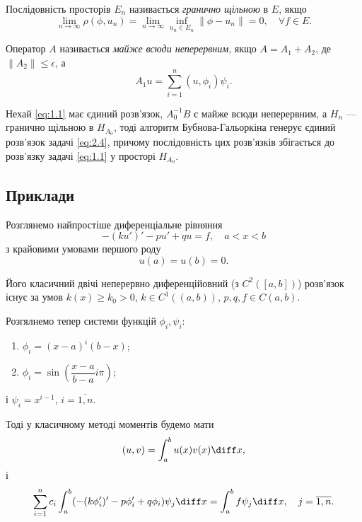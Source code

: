 \begin{definition}
    Послідовність просторів $E_n$ називається \textit{гранично щільною} в $E$, якщо 
    \begin{equation}
        \label{eq:2.5}
        \lim_{n \to \infty} \rho(\phi, u_n) = \lim_{n \to \infty} \inf_{u_n \in E_n} \|\phi - u_n\| = 0, \quad \forall f \in E.
    \end{equation}
\end{definition}
\begin{definition}
    Оператор $A$ називається \textit{майже всюди неперервним}, якщо $A = A_1 + A_2$, де $\|A_2\| \le \epsilon$, а \[A_1 u = \sum_{i = 1}^n (u, \phi_i) \psi_i.\]
\end{definition}

\begin{theorem}
    Нехай \eqref{eq:1.1} має єдиний розв'язок, $A_0^{-1} B$ є майже всюди неперервним, а $H_n$ --- гранично щільною в $H_{A_0}$, тоді алгоритм Бубнова-Гальоркіна генерує єдиний розв'язок задачі \eqref{eq:2.4}, причому послідовність цих розв'язків збігається до розв'язку задачі \eqref{eq:1.1} у просторі $H_{A_0}$.
\end{theorem}
\subsection{Приклади}
\begin{example}
    Розглянемо найпростіше диференціальне рівняння
    \begin{equation}
        \label{eq:2.6}
        -(ku')'-pu'+qu=f,\quad a<x<b
    \end{equation}
    з крайовими умовами першого роду
    \begin{equation}
        \label{eq:2.7}
        u(a)=u(b)=0.
    \end{equation}
\end{example}
Його класичний двічі неперервно диференційовний (з $C^2([a,b])$) розв'язок існує за умов $k(x) \ge k_0 > 0$, $k \in C^1((a,b))$, $p,q,f \in C(a,b)$. \medskip

Розгялнемо тепер системи функцій $\phi_i,\psi_i$:
\begin{enumerate}
    \item $\phi_i = (x - a)^i (b - x)$;
    \item $\phi_i = \sin \left( \dfrac{x - a}{b - a} i \pi \right)$;
\end{enumerate}
і $\psi_i = x^{i - 1}$, $i = \overline{1,n}$. \medskip

Тоді у класичному методі моментів будемо мати
\begin{equation*}
    (u,v)=\int_a^b u(x)v(x) \diff x,
\end{equation*}
і
\begin{equation}
    \label{eq:2.8}
    \sum_{i=1}^n c_i \int_a^b (-(k\phi_i')'-p \phi_i' + q\phi_i)\psi_j \diff x = \int_a^b f \psi_j \diff x, \quad j = \overline{1,n}.
\end{equation}


